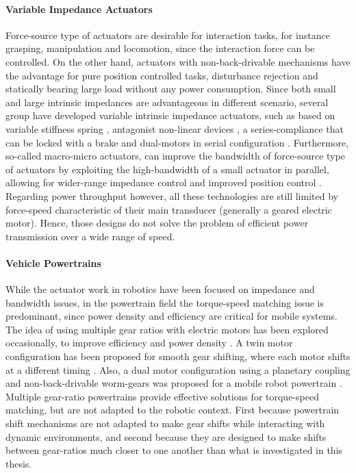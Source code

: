 \paragraph{Variable Impedance Actuators} Force-source type of actuators are desirable for interaction tasks, for instance grasping, manipulation and locomotion, since the interaction force can be controlled. On the other hand, actuators with non-back-drivable mechanisms have the advantage for pure position controlled tasks, disturbance rejection and statically bearing large load without any power consumption. Since both small and large intrinsic impedances are advantageous in different scenario, several group have developed variable intrinsic impedance actuators, such as based on variable stiffness spring \cite{tonietti_design_2005}, antagonist non-linear devices \cite{koganezawa_antagonistic_2006}, a series-compliance that can be locked with a brake \cite{leach_linear_2012} and dual-motors in serial configuration \cite{kim_serial-type_2010}. Furthermore, so-called macro-micro actuators, can improve the bandwidth of force-source type of actuators by exploiting the high-bandwidth of a small actuator in parallel, allowing for wider-range impedance control and improved position control \cite{morrell_parallel-coupled_1998}. Regarding power throughput however, all these technologies are still limited by force-speed characteristic of their main transducer (generally a geared electric motor). Hence, those designs do not solve the problem of efficient power transmission over a wide range of speed.

\paragraph{Vehicle Powertrains} While the actuator work in robotics have been focused on impedance and bandwidth issues, in the powertrain field the torque-speed matching issue is predominant, since power density and efficiency are critical for mobile systems. The idea of using multiple gear ratios with electric motors has been explored occasionally, to improve efficiency and power density \cite{mckeegan_antonovs_2011} \cite{lacerte_design_2016} \cite{pouliot_design_2015}. A twin motor configuration has been proposed for smooth gear shifting, where each motor shifts at a different timing \cite{bologna_electric_2014}. Also, a dual motor configuration using a planetary coupling and non-back-drivable worm-gears was proposed for a mobile robot powertrain \cite{lee_new_2012}. Multiple gear-ratio powertrains provide effective solutions for torque-speed matching, but are not adapted to the robotic context. First because powertrain shift mechanisms are not adapted to make gear shifts while interacting with dynamic environments, and second because they are designed to make shifts between gear-ratios much closer to one another than what is investigated in this thesis.

